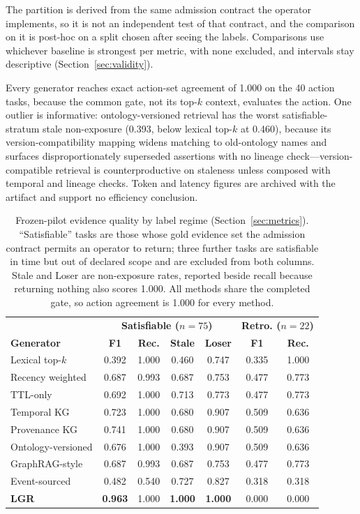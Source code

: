 \documentclass[conference]{IEEEtran}
\newcommand{\lgr}{\textsc{LGR}\xspace}
\begin{document}
The partition is derived from the same admission contract the operator implements, so it is not an independent test of that contract, and the comparison on it is post-hoc on a split chosen after seeing the labels. Comparisons use whichever baseline is strongest per metric, with none excluded, and intervals stay descriptive (Section~\ref{sec:validity}).

Every generator reaches exact action-set agreement of 1.000 on the 40 action tasks, because the common gate, not its top-$k$ context, evaluates the action. One outlier is informative: ontology-versioned retrieval has the worst satisfiable-stratum stale non-exposure (0.393, below lexical top-$k$ at 0.460), because its version-compatibility mapping widens matching to old-ontology names and surfaces disproportionately superseded assertions with no lineage check---version-compatible retrieval is counterproductive on staleness unless composed with temporal and lineage checks. Token and latency figures are archived with the artifact and support no efficiency conclusion.

\begin{table}[t]
\caption{Frozen-pilot evidence quality by label regime (Section~\ref{sec:metrics}). ``Satisfiable'' tasks are those whose gold evidence set the admission contract permits an operator to return; three further tasks are satisfiable in time but out of declared scope and are excluded from both columns. Stale and Loser are non-exposure rates, reported beside recall because returning nothing also scores 1.000. All methods share the completed gate, so action agreement is 1.000 for every method.}
\label{tab:main}
\centering\footnotesize\renewcommand{\arraystretch}{0.98}
\begin{tabular*}{\columnwidth}{@{\extracolsep{\fill}}lcccc|cc@{}}
\toprule
& \multicolumn{4}{c|}{\textbf{Satisfiable ($n{=}75$)}} & \multicolumn{2}{c}{\textbf{Retro. ($n{=}22$)}}\\
\textbf{Generator} & \textbf{F1} & \textbf{Rec.} & \textbf{Stale} & \textbf{Loser} & \textbf{F1} & \textbf{Rec.}\\
\midrule
Lexical top-$k$ & 0.392 & 1.000 & 0.460 & 0.747 & 0.335 & 1.000\\
Recency weighted & 0.687 & 0.993 & 0.687 & 0.753 & 0.477 & 0.773\\
TTL-only & 0.692 & 1.000 & 0.713 & 0.773 & 0.477 & 0.773\\
Temporal KG & 0.723 & 1.000 & 0.680 & 0.907 & 0.509 & 0.636\\
Provenance KG & 0.741 & 1.000 & 0.680 & 0.907 & 0.509 & 0.636\\
Ontology-versioned & 0.676 & 1.000 & 0.393 & 0.907 & 0.509 & 0.636\\
GraphRAG-style & 0.687 & 0.993 & 0.687 & 0.753 & 0.477 & 0.773\\
Event-sourced & 0.482 & 0.540 & 0.727 & 0.827 & 0.318 & 0.318\\
\textbf{\lgr} & \textbf{0.963} & 1.000 & \textbf{1.000} & \textbf{1.000} & 0.000 & 0.000\\
\bottomrule
\end{tabular*}
\end{table}
\end{document}
